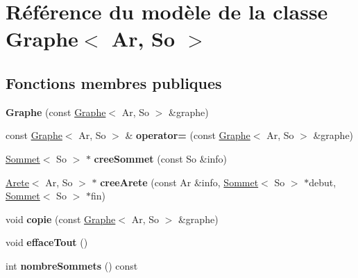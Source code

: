 \hypertarget{class_graphe}{}\section{Référence du modèle de la classe Graphe$<$ Ar, So $>$}
\label{class_graphe}
\subsection*{Fonctions membres publiques}
\begin{DoxyCompactItemize}
\item 
\mbox{\label{class_graphe_a2f7f1d595ff97ca1235d1865001072f6}} 
{\bfseries Graphe} (const \mbox{\hyperlink{class_graphe}{Graphe}}$<$ Ar, So $>$ \&graphe)
\item 
\mbox{\label{class_graphe_a19d0e98fe9a00e7336bc3a0a7e51037d}} 
const \mbox{\hyperlink{class_graphe}{Graphe}}$<$ Ar, So $>$ \& {\bfseries operator=} (const \mbox{\hyperlink{class_graphe}{Graphe}}$<$ Ar, So $>$ \&graphe)
\item 
\mbox{\label{class_graphe_a01775aa1e7cc4c2d4e6c133272214fa2}} 
\mbox{\hyperlink{class_sommet}{Sommet}}$<$ So $>$ $\ast$ {\bfseries cree\+Sommet} (const So \&info)
\item 
\mbox{\label{class_graphe_a421b311fe90f32d067e2a3c76e7978ce}} 
\mbox{\hyperlink{class_arete}{Arete}}$<$ Ar, So $>$ $\ast$ {\bfseries cree\+Arete} (const Ar \&info, \mbox{\hyperlink{class_sommet}{Sommet}}$<$ So $>$ $\ast$debut, \mbox{\hyperlink{class_sommet}{Sommet}}$<$ So $>$ $\ast$fin)
\item 
\mbox{\label{class_graphe_a21a446a7772cbb4bc6f3c41f23aa61b7}} 
void {\bfseries copie} (const \mbox{\hyperlink{class_graphe}{Graphe}}$<$ Ar, So $>$ \&graphe)
\item 
\mbox{\label{class_graphe_a89dc75d563f482d37ebce765348996fa}} 
void {\bfseries efface\+Tout} ()
\item 
\mbox{\label{class_graphe_abe8516e1c8adb1334c2eaad96d4a51e6}} 
int {\bfseries nombre\+Sommets} () const
\item 
\mbox{\label{class_graphe_a0c81ecd1aa71ed81f5163b6c0fe5a89e}} 

\end{DoxyCompactItemize}
